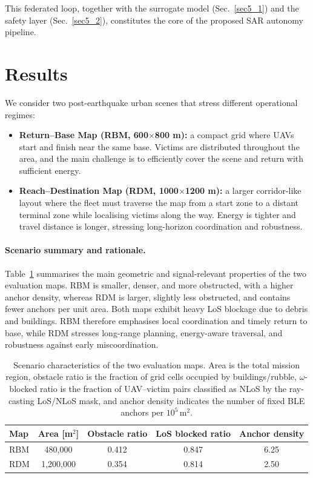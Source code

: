 \documentclass[drones,article,accept,pdftex,moreauthors]{Definitions/mdpi}
\begin{document}
This federated loop, together with the surrogate model
(Sec.~\ref{sec5_1}) and the safety layer (Sec.~\ref{sec5_2}),
constitutes the core of the proposed SAR autonomy pipeline.


\section{Results}\label{sec2}

We consider two post-earthquake urban scenes that stress different
operational regimes:

\begin{itemize}[leftmargin=*,noitemsep]
  \item \textbf{Return--Base Map (RBM, 600$\times$800 m):} a compact
  grid where UAVs start and finish near the same base. Victims are
  distributed throughout the area, and the main challenge is to
  efficiently cover the scene and return with sufficient energy.
  \item \textbf{Reach--Destination Map (RDM, 1000$\times$1200 m):}
  a larger corridor-like layout where the fleet must traverse the
  map from a start zone to a distant terminal zone while localising
  victims along the way. Energy is tighter and travel distance is
  longer, stressing long-horizon coordination and robustness.
\end{itemize}


\paragraph{Scenario summary and rationale.}
Table~\ref{tab:scenario_stats} summarises the main geometric and signal-relevant
properties of the two evaluation maps. RBM is smaller, denser, and more obstructed,
with a higher anchor density, whereas RDM is larger, slightly less obstructed, and
contains fewer anchors per unit area. Both maps exhibit heavy LoS blockage due to
debris and buildings. RBM therefore emphasises local coordination and timely return
to base, while RDM stresses long-range planning, energy-aware traversal, and
robustness against early miscoordination.


\begin{table}[H]
\centering
\caption{Scenario characteristics of the two evaluation maps. Area is the total mission region, obstacle ratio is the fraction of grid cells occupied by buildings/rubble, $\omega$-blocked ratio is the fraction of UAV--victim pairs classified as NLoS by the ray-casting LoS/NLoS mask, and anchor density indicates the number of fixed BLE anchors per $10^5\,\text{m}^2$.}
\label{tab:scenario_stats}
\begin{tabular*}{\linewidth}{@{\extracolsep{\fill}} lcccc }
\toprule
\textbf{Map} & \textbf{Area [m$^2$]} & \textbf{Obstacle ratio} & \textbf{LoS blocked ratio} & \textbf{Anchor density} \\
\midrule
RBM & 480,000   & 0.412 & 0.847 & 6.25 \\
RDM & 1,200,000 & 0.354 & 0.814 & 2.50 \\
\bottomrule
\end{tabular*}
\end{table}
\end{document}
